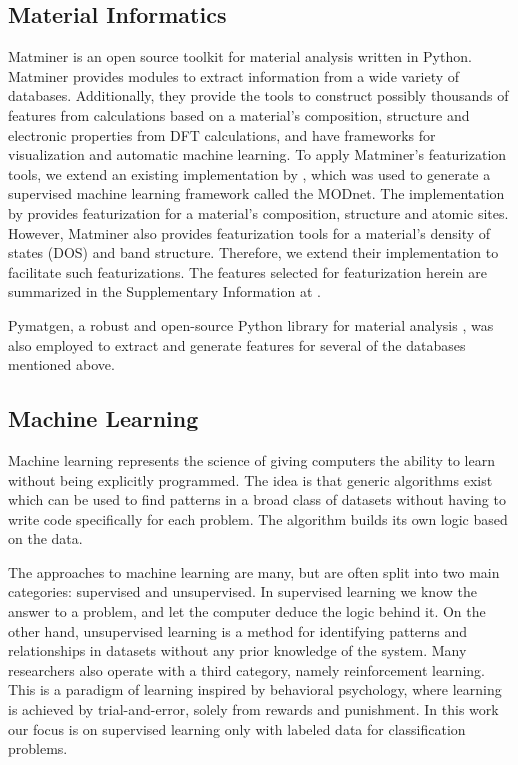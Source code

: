 \documentclass[superscriptaddress,unsortedaddress,
 amsmath,amssymb,
 aps,
]{revtex4-2}
\begin{document}
\subsection*{Material Informatics}  
Matminer \cite{Ward2018} is an open source toolkit for material analysis written in Python. Matminer provides modules to extract information from a wide variety of databases. Additionally, they provide the tools to construct possibly thousands of features from calculations based on a material's composition, structure and electronic properties from DFT calculations, and have frameworks for visualization and automatic machine learning. 
To apply Matminer's featurization tools, we extend an existing implementation by \citeauthor{Breuck2021} \cite{Breuck2021}, which was used to generate a supervised machine learning framework called the MODnet. The implementation by \citeauthor{Breuck2021} provides featurization for a material's composition, structure and atomic sites. However, Matminer also provides featurization tools for a material's density of states (DOS) and band structure. Therefore, we extend their implementation to facilitate such featurizations. The features selected for featurization herein are summarized in the Supplementary Information at \cite{supplementary}. 

Pymatgen, a robust and open-source Python library for material analysis \cite{pymatgen}, was also employed to extract and generate features for several of the databases mentioned above. 

\subsection*{Machine Learning} 

Machine learning represents the science of giving computers the ability to learn without being explicitly programmed. The idea is that generic algorithms exist which can be used to find patterns in a broad class of datasets without having to write code specifically for each problem. The algorithm builds its own logic based on the data. 

The approaches to machine learning are many, but are often split into two main categories: supervised and unsupervised. In supervised learning we know the answer to a problem, and let the computer deduce the logic behind it. On the other hand, unsupervised learning is a method for identifying patterns and relationships in datasets without any prior knowledge of the system. Many researchers also operate with a third category, namely reinforcement learning. This is a paradigm of learning inspired by behavioral psychology, where learning is achieved by trial-and-error, solely from rewards and punishment. In this work our focus is on supervised learning only with labeled data for classification problems.
\end{document}

